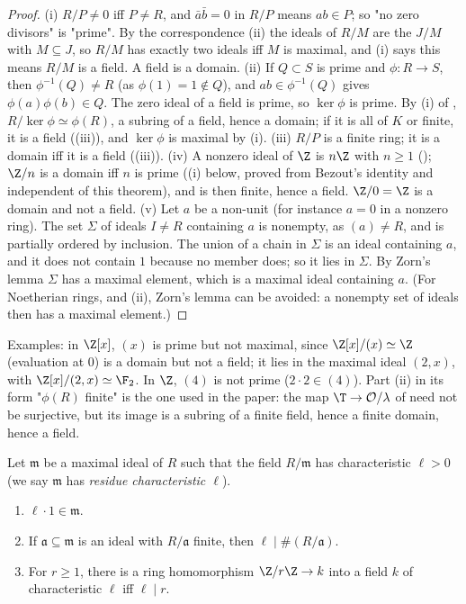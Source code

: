 \begin{proof}
(i) $R/P\ne0$ iff $P\ne R$, and $\bar a\bar b=0$ in $R/P$ means $ab\in P$; so "no zero divisors" is "prime". By the correspondence
(ii) the ideals of $R/M$ are the $J/M$ with $M\subseteq J$, so $R/M$ has exactly two ideals iff $M$ is maximal,
and (i) says this means $R/M$ is a field. A field is a domain.
(ii) If $Q\subset S$ is prime and $\phi\colon R\to S$, then $\phi^{-1}(Q)\ne R$ (as $\phi(1)=1\notin Q$), and $ab\in\phi^{-1}(Q)$ gives $\phi(a)\phi(b)\in Q$.
The zero ideal of a field is prime, so $\ker\phi$ is prime. By (i) of , $R/\ker\phi\simeq\phi(R)$, a subring of a
field, hence a domain; if it is all of $K$ or finite, it is a field ((iii)), and $\ker\phi$ is maximal by (i).
(iii) $R/P$ is a finite ring; it is a domain iff it is a field ((iii)).
(iv) A nonzero ideal of $\Z$ is $n\Z$ with $n\ge1$ (); $\Z/n$ is a domain iff $n$ is prime
((i) below, proved from Bezout's identity and independent of this theorem), and is then finite, hence a field. $\Z/0=\Z$ is a domain and not a field.
(v) Let $a$ be a non-unit (for instance $a=0$ in a nonzero ring). The set $\Sigma$ of ideals $I\ne R$ containing $a$ is nonempty, as
$(a)\ne R$, and is partially ordered by inclusion. The union of a chain in $\Sigma$ is an ideal containing $a$, and it does not
contain $1$ because no member does; so it lies in $\Sigma$. By Zorn's lemma $\Sigma$ has a maximal element, which is a maximal ideal
containing $a$. (For Noetherian rings,  and (ii), Zorn's lemma can be
avoided: a nonempty set of ideals then has a maximal element.)
\end{proof}

Examples: in $\Z[x]$, $(x)$ is prime but not maximal, since $\Z[x]/(x)\simeq\Z$ (evaluation at $0$) is a domain but not a field; it lies in the maximal
ideal $(2,x)$, with $\Z[x]/(2,x)\simeq\F_2$. In $\Z$, $(4)$ is not prime ($2\cdot2\in(4)$). Part (ii) in its form "$\phi(R)$ finite" is the one used in the
paper: the map $\T\to\mathcal O/\lambda$ of  need not be surjective, but its image is a subring of a finite field, hence
a finite domain, hence a field.

\begin{proposition}\label{prop:rings:residue-char}
Let $\mathfrak m$ be a maximal ideal of $R$ such that the field $R/\mathfrak m$ has characteristic $\ell>0$ (we say $\mathfrak m$ has
\emph{residue characteristic $\ell$}).
\begin{enumerate}[label=(\roman*)]
\item $\ell\cdot1\in\mathfrak m$.
\item If $\mathfrak a\subseteq\mathfrak m$ is an ideal with $R/\mathfrak a$ finite, then $\ell\mid\#(R/\mathfrak a)$.
\item For $r\ge1$, there is a ring homomorphism $\Z/r\Z\to k$ into a field $k$ of characteristic $\ell$ iff $\ell\mid r$.
\end{enumerate}
\end{proposition}

